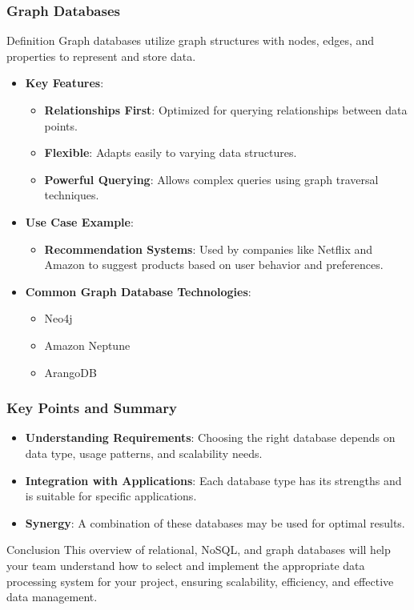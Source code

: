 \documentclass[aspectratio=169]{beamer}
\begin{document}
\begin{frame}[fragile]
    \frametitle{Graph Databases}
    \begin{block}{Definition}
        Graph databases utilize graph structures with nodes, edges, and properties to represent and store data.
    \end{block}

    \begin{itemize}
        \item \textbf{Key Features}:
        \begin{itemize}
            \item \textbf{Relationships First}: Optimized for querying relationships between data points.
            \item \textbf{Flexible}: Adapts easily to varying data structures.
            \item \textbf{Powerful Querying}: Allows complex queries using graph traversal techniques.
        \end{itemize}

        \item \textbf{Use Case Example}:
        \begin{itemize}
            \item \textbf{Recommendation Systems}: Used by companies like Netflix and Amazon to suggest products based on user behavior and preferences.
        \end{itemize}
        
        \item \textbf{Common Graph Database Technologies}:
        \begin{itemize}
            \item Neo4j
            \item Amazon Neptune
            \item ArangoDB
        \end{itemize}
    \end{itemize}
\end{frame}

\begin{frame}[fragile]
    \frametitle{Key Points and Summary}
    \begin{itemize}
        \item \textbf{Understanding Requirements}: Choosing the right database depends on data type, usage patterns, and scalability needs.
        \item \textbf{Integration with Applications}: Each database type has its strengths and is suitable for specific applications.
        \item \textbf{Synergy}: A combination of these databases may be used for optimal results.
    \end{itemize}

    \begin{block}{Conclusion}
        This overview of relational, NoSQL, and graph databases will help your team understand how to select and implement the appropriate data processing system for your project, ensuring scalability, efficiency, and effective data management.
    \end{block}
\end{frame}
\end{document}
